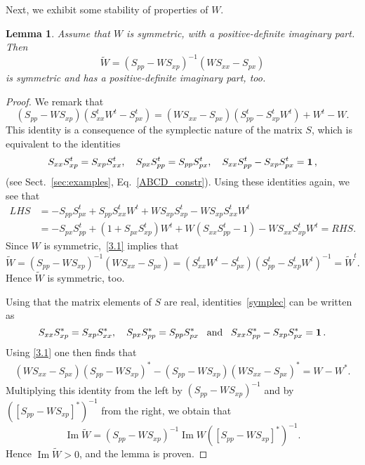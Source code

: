 \documentclass[11pt]{article}
\newtheorem{lemma}[theorem]{Lemma}
\renewcommand{\Im}{\operatorname{Im}}
\begin{document}
Next, we exhibit some stability of properties of $W$.
\begin{lemma}
\label{Wsymmetric}Assume that $W$ is symmetric, with a positive-definite imaginary part. Then 
$$\tilde W = (S_{pp} - W S_{xp})^{-1}(WS_{xx} - S_{px})$$ 
is symmetric and has a positive-definite imaginary part, too.
\end{lemma}
\begin{proof}
	We remark that
	\begin{equation}\label{3.1}
	(S_{pp} - W S_{xp})(S_{xx}^t W^t - S_{px}^t) = (W S_{xx} - S_{px})( S_{pp}^t - S_{xp}^t W^t) + W^t - W.
	\end{equation}
	This identity is a consequence of the symplectic nature of the matrix $S$, which is equivalent to the identities	
		\begin{equation}\label{symplec}
S_{xx} S_{xp}^t = S_{xp} S_{xx}^t, \quad S_{px} S_{pp}^t = S_{pp} S_{px}^t, 
\quad S_{xx} S_{pp}^t - S_{xp} S_{px}^t = {\bf{1}}\,,
\end{equation}
	(see Sect.~\ref{sec:examples}, Eq.~\eqref{ABCD_constr}). Using these identities again, we see that 
	\begin{align*}
	LHS &= - S_{pp} S_{px}^t + S_{pp} S_{xx}^t W^t + W S_{xp} 
	 S_{xp}^t  -  W S_{xp} S_{xx}^t W^t \\
	&=- S_{px}S_{pp}^t + (1+  S_{px}  S_{xp}^t) W^t + W(S_{xx}S_{pp}^t-1) - WS_{xx}S_{xp}^tW^t = RHS.
	\end{align*}
	Since $W$ is symmetric,~\eqref{3.1} implies that 
	\begin{equation*}
	\tilde W = (S_{pp} - W S_{xp})^{-1}(WS_{xx} - S_{px})= (S_{xx}^t W^t - S_{px}^t)(S_{pp}^t - S_{xp}^t W^t )^{-1} = 
	\tilde W^t.
	\end{equation*}
	Hence $\tilde W$ is symmetric, too.
	
	Using that the matrix elements of $S$ are real, identities~\eqref{symplec} can be written as 
	$$S_{xx} S_{xp}^* = S_{xp} S_{xx}^*, \quad S_{px} S_{pp}^* = S_{pp} S_{px}^* \,\,\, \text{  and  }\, \,\,
	S_{xx} S_{pp}^* - S_{xp} S_{px}^* = {\bf{1}}\,.$$ 
Using \eqref{3.1} one then finds that 
	\begin{align}\label{ping}
	(WS_{xx} -S_{px})(S_{pp}- WS_{xp})^* - (S_{pp}-WS_{xp})(WS_{xx} - S_{px})^* = W - W^*.
	\end{align}
	Multiplying this identity from the left by $(S_{pp} - WS_{xp})^{-1}$ and by 
	$([S_{pp} - WS_{xp}]^{*})^{-1}$ from the right, we obtain that 
	$$\Im\tilde W=(S_{pp}-WS_{xp})^{-1}\Im W {([S_{pp}-WS_{xp}]^{*})}^{-1}.$$
	Hence $\Im \tilde W>0$, and the lemma is proven.
\end{proof}
\end{document}
